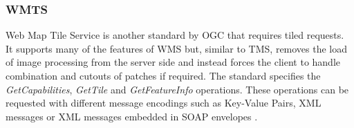 \subsubsection{WMTS}

Web Map Tile Service is another standard by OGC that requires tiled requests. It supports many of the features of WMS but, similar to TMS, removes the load of image processing from the server side and instead forces the client to handle combination and cutouts of patches if required. The standard specifies the \emph{GetCapabilities}, \emph{GetTile} and \emph{GetFeatureInfo} operations. These operations can be requested with different message encodings such as Key-Value Pairs, XML messages or XML messages embedded in SOAP envelopes \cite{wmts10}.

